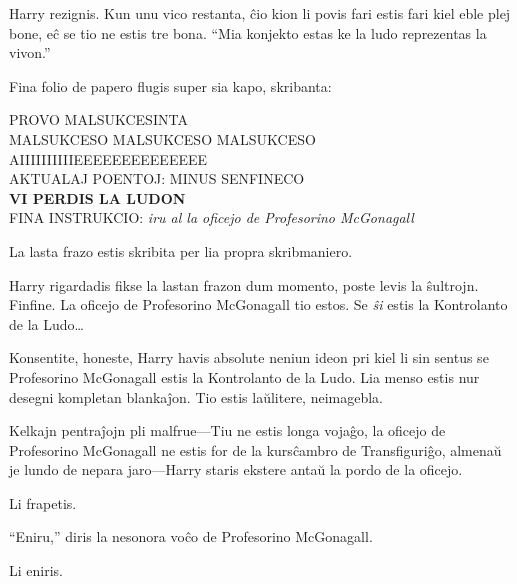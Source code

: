 Harry rezignis. Kun unu vico restanta, ĉio kion li povis fari estis fari kiel
eble plej bone, eĉ se tio ne estis tre bona. ``Mia konjekto estas ke la ludo
reprezentas la vivon.''

Fina folio de papero flugis super sia kapo, skribanta:
\begin{center}
  PROVO MALSUKCESINTA\\
  MALSUKCESO MALSUKCESO MALSUKCESO\\
  AIIIIIIIIIIEEEEEEEEEEEEEE\\
  AKTUALAJ POENTOJ: MINUS SENFINECO\\
  \textbf{VI PERDIS LA LUDON}\\
  FINA INSTRUKCIO: \emph{iru al la oficejo de Profesorino McGonagall}
\end{center}

La lasta frazo estis skribita per lia propra skribmaniero.

Harry rigardadis fikse la lastan frazon dum momento, poste
levis la ŝultrojn. Finfine. La oficejo de Profesorino McGonagall tio
estos. Se \emph{ŝi} estis la Kontrolanto de la Ludo\ldots

Konsentite, honeste, Harry havis absolute neniun ideon pri kiel li sin sentus se
Profesorino McGonagall estis la Kontrolanto de la Ludo. Lia menso estis nur
desegni kompletan blankaĵon. Tio estis laŭlitere, neimagebla.

Kelkajn pentraĵojn pli malfrue—Tiu ne estis longa vojaĝo, la oficejo de Profesorino McGonagall ne estis for de la kursĉambro de Transfiguriĝo, almenaŭ je lundo de nepara jaro—Harry staris ekstere antaŭ la pordo de la oficejo.

Li frapetis.

``Eniru,'' diris la nesonora voĉo de Profesorino McGonagall.

Li eniris.




